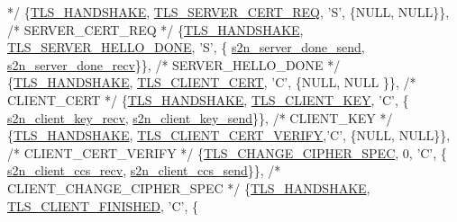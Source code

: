 \begin{DoxyCode}
{                    */}
    \{\hyperlink{s2n__fragmentation__coalescing__test_8c_a04fd920fd9f28238887e4c6417b4d4cc}{TLS\_HANDSHAKE}, \hyperlink{s2n__handshake__io_8c_a1a7828d23227c0e93bc09824b18a46ae}{TLS\_SERVER\_CERT\_REQ},   \textcolor{charliteral}{'S'}, \{NULL,                     
      NULL\}\},                     \textcolor{comment}{/* SERVER\_CERT\_REQ           */}
    \{\hyperlink{s2n__fragmentation__coalescing__test_8c_a04fd920fd9f28238887e4c6417b4d4cc}{TLS\_HANDSHAKE}, \hyperlink{s2n__handshake__io_8c_ad4a7ea7191525f41bbdf0775c35eff6e}{TLS\_SERVER\_HELLO\_DONE}, \textcolor{charliteral}{'S'}, \{
      \hyperlink{s2n__server__done_8c_a944852f699b2815f6a37b602113e26f7}{s2n\_server\_done\_send},     \hyperlink{s2n__server__done_8c_a55414ad2a6f07ebbae51cbd0bf6f5974}{s2n\_server\_done\_recv}\}\},     \textcolor{comment}{/*
       SERVER\_HELLO\_DONE         */}
    \{\hyperlink{s2n__fragmentation__coalescing__test_8c_a04fd920fd9f28238887e4c6417b4d4cc}{TLS\_HANDSHAKE}, \hyperlink{s2n__handshake__io_8c_aaf660cd50e825aeb1b481c61862c4226}{TLS\_CLIENT\_CERT},       \textcolor{charliteral}{'C'}, \{NULL,                     NULL
      \}\},                     \textcolor{comment}{/* CLIENT\_CERT               */}
    \{\hyperlink{s2n__fragmentation__coalescing__test_8c_a04fd920fd9f28238887e4c6417b4d4cc}{TLS\_HANDSHAKE}, \hyperlink{s2n__handshake__io_8c_a32b656089b312b746625119dce8119b3}{TLS\_CLIENT\_KEY},        \textcolor{charliteral}{'C'}, \{
      \hyperlink{s2n__client__key__exchange_8c_a5d0b0b0a8964b40aff5e3562bf65a9e1}{s2n\_client\_key\_recv},      \hyperlink{s2n__client__key__exchange_8c_a59294a875b6596b8dd5ad02a58e77c94}{s2n\_client\_key\_send}\}\},      \textcolor{comment}{/* CLIENT\_KEY  
                    */}
    \{\hyperlink{s2n__fragmentation__coalescing__test_8c_a04fd920fd9f28238887e4c6417b4d4cc}{TLS\_HANDSHAKE}, \hyperlink{s2n__handshake__io_8c_a0d1a6202ecebb1f9fd64cd8da6021249}{TLS\_CLIENT\_CERT\_VERIFY},\textcolor{charliteral}{'C'}, \{NULL,                  
         NULL\}\},                     \textcolor{comment}{/* CLIENT\_CERT\_VERIFY        */}
    \{\hyperlink{s2n__tls__parameters_8h_a5788d973268381c45d0909ebc14a16fd}{TLS\_CHANGE\_CIPHER\_SPEC}, 0,            \textcolor{charliteral}{'C'}, \{
      \hyperlink{s2n__client__ccs_8c_aab9d53a394720e55e7648730f94bb176}{s2n\_client\_ccs\_recv},      \hyperlink{s2n__client__ccs_8c_a9be1791dfd4b0af9525be21fb52ec4eb}{s2n\_client\_ccs\_send}\}\},      \textcolor{comment}{/*
       CLIENT\_CHANGE\_CIPHER\_SPEC */}
    \{\hyperlink{s2n__fragmentation__coalescing__test_8c_a04fd920fd9f28238887e4c6417b4d4cc}{TLS\_HANDSHAKE}, \hyperlink{s2n__handshake__io_8c_aab129406e117bb0c60df5ffda5596c34}{TLS\_CLIENT\_FINISHED},   \textcolor{charliteral}{'C'}, \{

\end{DoxyCode}
